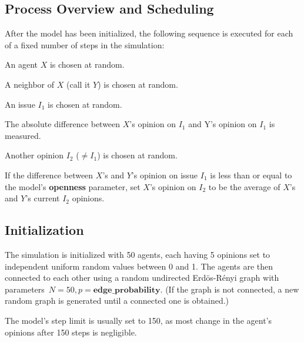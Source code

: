 \subsection{Process Overview and Scheduling}
\label{modelProcess}

After the model has been initialized, the following sequence is executed for
each of a fixed number of steps in the simulation:

\begin{compactenum}
\item An agent $X$ is chosen at random.  
\item A neighbor of $X$ (call it $Y$) is chosen at random.
\item An issue $I_1$ is chosen at random.
\item The absolute difference between $X$'s opinion on $I_1$ and Y's opinion on
$I_1$ is measured.
\item Another opinion $I_2$ ($\neq I_1$) is chosen at random.
\item If the difference between $X$'s and $Y$'s opinion on issue $I_1$ is less
than or equal to the model's \textbf{openness} parameter, set $X$'s opinion on
$I_2$ to be the average of $X$'s and $Y$'s current $I_2$ opinions.
\end{compactenum}



\subsection{Initialization}

The simulation is initialized with 50 agents, each having 5 opinions set to
independent uniform random values between 0 and 1. The agents are then
connected to each other using a random undirected Erd\"{o}s-R\'{e}nyi
graph\cite{erdos_random_1959} with parameters\ $N=50,
p=\textbf{edge\_probability}$. (If the graph is not connected, a new random
graph is generated until a connected one is obtained.)

The model's step limit is usually set to 150, as most change in the agent's
opinions after 150 steps is negligible.

